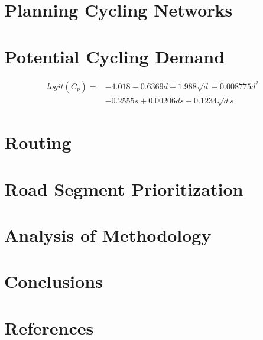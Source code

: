\documentclass[]{elsarticle} %
\begin{document}
\hypertarget{planning-cycling-networks}{%
\section{Planning Cycling Networks}\label{planning-cycling-networks}}

\hypertarget{potential-cycling-demand}{%
\section{Potential Cycling Demand}\label{potential-cycling-demand}}

\begin{align}\label{eq:pcteqn}
     logit(C_{p}) = & -4.018 - 0.6369d +  1.988\sqrt{d} + 0.008775d^2\\ & - 0.2555s + 0.00206ds -0.1234\sqrt{d}s\nonumber 
\end{align}

\hypertarget{routing}{%
\section{Routing}\label{routing}}

\hypertarget{road-segment-prioritization}{%
\section{Road Segment
Prioritization}\label{road-segment-prioritization}}

\hypertarget{analysis-of-methodology}{%
\section{Analysis of Methodology}\label{analysis-of-methodology}}

\hypertarget{conclusions}{%
\section{Conclusions}\label{conclusions}}

\hypertarget{references}{%
\section*{References}\label{references}}
\end{document}
